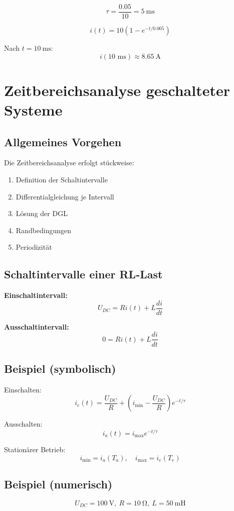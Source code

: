 \documentclass[a4paper,11pt]{article}
\begin{document}
\[
\tau=\frac{0.05}{10}=\SI{5}{\milli\second}
\]

\[
i(t)=10\left(1-e^{-t/0.005}\right)
\]

Nach $t=\SI{10}{\milli\second}$:
\[
i(10\text{ ms})\approx\SI{8.65}{\ampere}
\]

\section{Zeitbereichsanalyse geschalteter Systeme}

\subsection{Allgemeines Vorgehen}
Die Zeitbereichsanalyse erfolgt stückweise:
\begin{enumerate}[leftmargin=*]
  \item Definition der Schaltintervalle
  \item Differentialgleichung je Intervall
  \item Lösung der DGL
  \item Randbedingungen
  \item Periodizität
\end{enumerate}

\subsection{Schaltintervalle einer RL-Last}

\textbf{Einschaltintervall:}
\[
U_{DC}=Ri(t)+L\frac{di}{dt}
\]

\textbf{Ausschaltintervall:}
\[
0=Ri(t)+L\frac{di}{dt}
\]

\subsection*{Beispiel (symbolisch)}
Einschalten:
\[
i_e(t)=\frac{U_{DC}}{R}+\left(i_{\min}-\frac{U_{DC}}{R}\right)e^{-t/\tau}
\]

Ausschalten:
\[
i_a(t)=i_{\max}e^{-t/\tau}
\]

Stationärer Betrieb:
\[
i_{\min}=i_a(T_a),\quad i_{\max}=i_e(T_e)
\]

\subsection*{Beispiel (numerisch)}
\[
U_{DC}=\SI{100}{\volt},\ R=\SI{10}{\ohm},\ L=\SI{50}{\milli\henry}
\]
\end{document}
